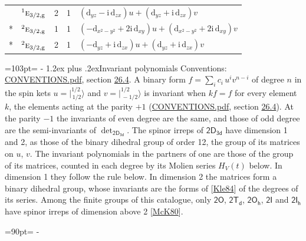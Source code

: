 \documentclass[10pt,a4paper]{article}
\makeatletter
\renewcommand\section{\@startsection{section}{1}{\z@}{-3ex plus -1ex minus -.2ex}%
  {1.2ex plus .2ex}{\normalfont\large\sffamily\bfseries\color{parttitle}}}
\newcommand{\needspace}[1]{\par\penalty-100\begingroup\dimen0=#1\relax\dimen2=\pagegoal
  \advance\dimen2-\pagetotal\ifdim\dimen0>\dimen2\relax\ifdim\dimen2>0pt\vfil\break\fi\fi
  \endgroup}
\numberwithin{equation}{section}
\newcommand{\grp}[1]{\mathsf{#1}}
\newcommand{\irr}[1]{\text{\normalfont\scshape #1}}
\newcommand{\conjpair}[1]{{}^{#1}}
\newcommand{\ptag}[1]{\mathrm{#1}}
\newcommand{\orbital}[1]{\mathrm{#1}}
\newcommand{\iunit}{\mathrm{i}}
\newcommand{\jm}[2]{\bigl\lvert{}^{#1}_{\,#2}\bigr\rangle}
\makeatother
\begin{document}
{\begin{longtable}{@{}llrrl@{}}
 & $\conjpair{1}\irr{e}_{3/2,\ptag{g}}$ & 2 & 1 & $\left(\orbital{d}_{yz} - \iunit{}\,\orbital{d}_{zx}\right)u+\left(\orbital{d}_{yz} + \iunit{}\,\orbital{d}_{zx}\right)v$\\*
 & $\conjpair{2}\irr{e}_{3/2,\ptag{g}}$ & 1 & 1 & $\left(-\orbital{d}_{x^2-y^2} + 2\iunit{}\,\orbital{d}_{xy}\right)u+\left(\orbital{d}_{x^2-y^2} + 2\iunit{}\,\orbital{d}_{xy}\right)v$\\*
 & $\conjpair{2}\irr{e}_{3/2,\ptag{g}}$ & 2 & 1 & $\left(-\orbital{d}_{yz} + \iunit{}\,\orbital{d}_{zx}\right)u+\left(\orbital{d}_{yz} + \iunit{}\,\orbital{d}_{zx}\right)v$\\
\bottomrule\end{longtable}}
\needspace{103pt}
\section{Invariant polynomials}\label{s:invariants}
Conventions: \href{../../CONVENTIONS.pdf}{CONVENTIONS.pdf}, section \href{../../CONVENTIONS.pdf\#conv.26.4}{26.4}.
\leavevmode\label{n:local.binary.form}A binary form $f = \sum_i c_i\, u^i v^{n-i}$ of degree $n$ in the spin kets $u = \jm{1/2}{1/2}$ and $v = \jm{1/2}{-1/2}$ is invariant when $k f = f$ for every element $k$, the elements acting at the parity $+1$ (\href{../../CONVENTIONS.pdf}{CONVENTIONS.pdf}, section \href{../../CONVENTIONS.pdf\#conv.26.4}{26.4}). At the parity $-1$ the invariants of even degree are the same, and those of odd degree are the semi-invariants of $\det_{\grp{2D_{3d}}}$.
The spinor irreps of $\grp{2D_{3d}}$ have dimension 1 and 2, as those of the binary dihedral group of order 12, the group of its matrices on $u$, $v$. \label{n:function.hilbert}The invariant polynomials in the partners of one are those of the group of its matrices, counted in each degree by its Molien series $H_V(t)$ below. In dimension 1 they follow the rule below. In dimension 2 the matrices form a binary dihedral group, whose invariants are the forms of [\href{../../../REFERENCES.pdf\#ref.Kle84}{Kle84}] of the degrees of its series. Among the finite groups of this catalogue, only $\grp{2O}$, $\grp{2T_{d}}$, $\grp{2O_{h}}$, $\grp{2I}$ and $\grp{2I_{h}}$ have spinor irreps of dimension above 2 [\href{../../../REFERENCES.pdf\#ref.McK80}{McK80}].
\needspace{90pt}
\end{document}
